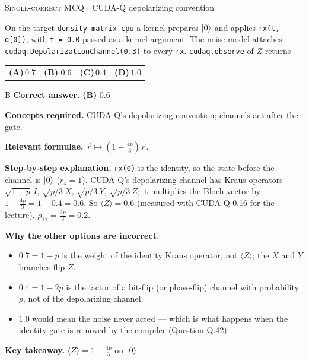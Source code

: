 \documentclass[11pt,a4paper]{article}
\newcommand{\optlabel}[1]{\textbf{(#1)}}
\newcommand{\correctlabel}[1]{\textcolor{okgreen}{\textbf{(#1)}\,\ding{51}}}
\newenvironment{qitem}[1]{\begin{list}{}{\setlength{\leftmargin}{3.3em}\setlength{\labelwidth}{3.1em}%
  \setlength{\labelsep}{0.2em}\setlength{\topsep}{3pt}\setlength{\parsep}{3pt}}\item[\textbf{Q.#1}\hfill]}{\end{list}}
\newcommand{\qsep}{\par\vspace{2pt}{\color{black!15}\hrule}\vspace{4pt}}
\newcommand{\qmeta}[2]{{\footnotesize\color{black!60}\textsc{#1} \;$\cdot$\; #2}\par}
\begin{document}
\begin{qitem}{41}
\qmeta{Single-correct MCQ}{CUDA-Q depolarizing convention}
On the target \texttt{density-matrix-cpu} a kernel prepares $\ket0$ and applies \texttt{rx(t, q[0])}, with \texttt{t = 0.0} passed as a kernel
argument. The noise model attaches \texttt{cudaq.DepolarizationChannel(0.3)} to every \texttt{rx}. \texttt{cudaq.observe} of $Z$ returns
\par\smallskip\noindent\begin{tabularx}{\linewidth}{@{}*{4}{L}@{}}
\optlabel{A}\,$0.7$ & \correctlabel{B}\,$0.6$ & \optlabel{C}\,$0.4$ & \optlabel{D}\,$1.0$
\end{tabularx}
\end{qitem}
\begin{solbox}{B}
\textbf{\color{brand}Correct answer.} \textcolor{okgreen}{\textbf{(B)}} $0.6$

\textbf{\color{brand}Concepts required.} CUDA-Q's depolarizing convention; channels act after the gate.

\textbf{\color{brand}Relevant formulae.} $\vec r \mapsto (1 - \frac{4p}{3})\vec r$.

\textbf{\color{brand}Step-by-step explanation.} \texttt{rx(0)} is the identity, so the state before the channel is $\ket0$ ($r_z = 1$). CUDA-Q's depolarizing channel has Kraus operators
$\sqrt{1-p}\,I$, $\sqrt{p/3}\,X$, $\sqrt{p/3}\,Y$, $\sqrt{p/3}\,Z$; it multiplies the Bloch vector by $1 - \frac{4p}{3} = 1 - 0.4 = 0.6$.
So $\langle Z\rangle = 0.6$ (measured with CUDA-Q 0.16 for the lecture). $\rho_{11} = \frac{2p}{3} = 0.2$.

\textbf{\color{brand}Why the other options are incorrect.}
\begin{itemize}[leftmargin=2.4em, itemsep=1pt, topsep=2pt]
\item[\textbf{(A)}] $0.7 = 1 - p$ is the weight of the identity Kraus operator, not $\langle Z\rangle$; the $X$ and $Y$ branches flip $Z$.
\item[\textbf{(C)}] $0.4 = 1 - 2p$ is the factor of a bit-flip (or phase-flip) channel with probability $p$, not of the depolarizing channel.
\item[\textbf{(D)}] $1.0$ would mean the noise never acted --- which is what happens when the identity gate is removed by the compiler (Question Q.42).
\end{itemize}
\textbf{\color{brand}Key takeaway.} $\langle Z\rangle = 1 - \frac{4p}{3}$ on $\ket0$.
\end{solbox}
\qsep
\end{document}
